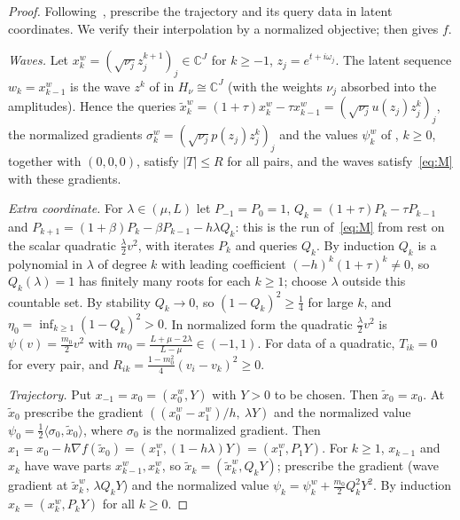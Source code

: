 \documentclass[11pt]{article}
\theoremstyle{definition}
\theoremstyle{remark}
\newcommand{\C}{\mathbb C}
\newcommand{\ip}[2]{\langle #1,#2\rangle}
\begin{document}
\begin{proof}
Following~\cite[Lemma~A.8]{TA}, prescribe the trajectory and its query data in
latent coordinates.  We verify their interpolation by a normalized objective;
 then gives \(f\).

\emph{Waves.}  Let \(x^w_k=(\sqrt{\nu_j}z_j^{k+1})_j\in\C^J\) for \(k\ge-1\), \(z_j=e^{t+i\omega_j}\).
The latent sequence \(w_k=x^w_{k-1}\) is the wave \(z^k\) of  in
\(H_\nu\cong\C^J\) (with the weights \(\nu_j\) absorbed into the amplitudes).  Hence the
queries \(\tilde x^w_k=(1+\tau)x^w_k-\tau x^w_{k-1}=(\sqrt{\nu_j}u(z_j)z_j^k)_j\), the normalized
gradients \(\sigma^w_k=(\sqrt{\nu_j}p(z_j)z_j^k)_j\) and the values \(\psi^w_k\) of ,
\(k\ge0\), together with \((0,0,0)\), satisfy \(|T|\le R\) for all pairs, and the
waves satisfy~\eqref{eq:M} with these gradients.

\emph{Extra coordinate.}  For \(\lambda\in(\mu,L)\) let \(P_{-1}=P_0=1\),
\(Q_k=(1+\tau)P_k-\tau P_{k-1}\) and \(P_{k+1}=(1+\beta)P_k-\beta P_{k-1}-h\lambda Q_k\): this is the run
of~\eqref{eq:M} from rest on the scalar quadratic \(\frac\lambda2v^2\), with iterates \(P_k\)
and queries \(Q_k\).  By induction \(Q_k\) is a polynomial in \(\lambda\) of degree \(k\) with
leading coefficient \((-h)^k(1+\tau)^k\ne0\), so \(Q_k(\lambda)=1\) has finitely many roots
for each \(k\ge1\); choose \(\lambda\) outside this countable set.  By stability \(Q_k\to0\), so
\((1-Q_k)^2\ge\frac14\) for large \(k\), and \(\eta_0=\inf_{k\ge1}(1-Q_k)^2>0\).  In normalized
form the quadratic \(\frac\lambda2v^2\) is \(\psi(v)=\frac{m_0}2v^2\) with
\(m_0=\frac{L+\mu-2\lambda}{L-\mu}\in(-1,1)\).  For data of a quadratic, \(T_{ik}=0\) for every
pair, and \(R_{ik}=\frac{1-m_0^2}4(v_i-v_k)^2\ge0\).

\emph{Trajectory.}  Put \(x_{-1}=x_0=(x^w_0,Y)\) with \(Y>0\) to be chosen.  Then
\(\tilde x_0=x_0\).  At \(\tilde x_0\) prescribe the gradient \(((x^w_0-x^w_1)/h,\ \lambda Y)\) and the
normalized value \(\psi_0=\frac12\ip{\sigma_0}{\tilde x_0}\), where \(\sigma_0\) is the normalized gradient.
Then \(x_1=x_0-h\nabla f(\tilde x_0)=(x^w_1,(1-h\lambda)Y)=(x^w_1,P_1Y)\).  For \(k\ge1\), \(x_{k-1}\) and \(x_k\)
have wave parts \(x^w_{k-1},x^w_k\), so \(\tilde x_k=(\tilde x^w_k,Q_kY)\); prescribe the gradient
(wave gradient at \(\tilde x^w_k\), \(\lambda Q_kY\)) and the normalized value
\(\psi_k=\psi^w_k+\frac{m_0}2Q_k^2Y^2\).  By induction \(x_k=(x^w_k,P_kY)\) for all \(k\ge0\).


\end{proof}
\end{document}
